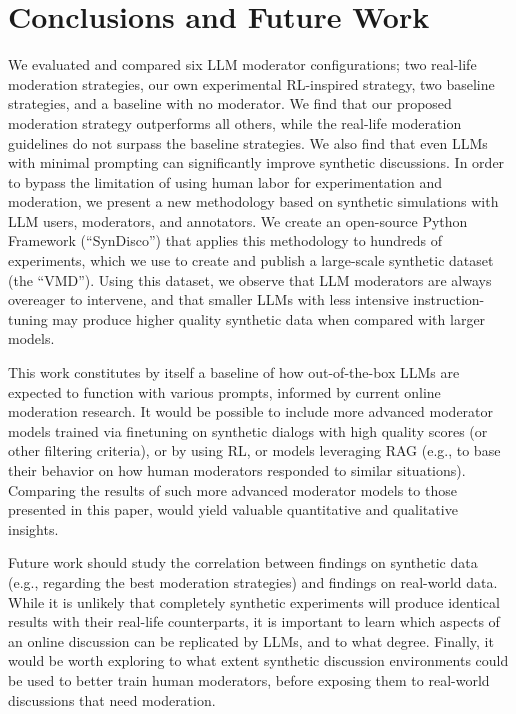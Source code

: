 %

\section{Conclusions and Future Work}

We evaluated and compared six \ac{LLM} moderator configurations; two real-life moderation strategies, our own experimental \ac{RL}-inspired strategy, two baseline strategies, and a baseline with no moderator. We find that our proposed moderation strategy outperforms all others, while the real-life moderation guidelines do not surpass the baseline strategies. We also find that even \acp{LLM} with minimal prompting can significantly improve synthetic discussions. In order to bypass the limitation of using human labor for experimentation and moderation, we present a new methodology based on synthetic simulations with \ac{LLM} users, moderators, and annotators. We create an open-source Python Framework (“SynDisco”) that applies this methodology to hundreds of experiments, which we use to create and publish a large-scale synthetic dataset (the “\acf{VMD}”). Using this dataset, we observe that \ac{LLM} moderators are always overeager to intervene, and that smaller \acp{LLM} with less intensive instruction-tuning may produce higher quality synthetic data when compared with larger models. 

This work constitutes by itself a baseline of how out-of-the-box \acp{LLM} are expected to function with various prompts, informed by current online moderation research. It would be possible to include more advanced  moderator models trained via finetuning on synthetic dialogs with high quality scores (or other filtering criteria), or by using \ac{RL}, or models leveraging \ac{RAG} (e.g., to base their behavior on how human moderators responded to similar situations). Comparing the results of such more advanced moderator models to those presented in this paper, would yield valuable quantitative and qualitative insights.

Future work should study the correlation between findings on synthetic data (e.g., regarding the best moderation strategies) and findings on real-world data. While it is unlikely that completely synthetic experiments will produce identical results with their real-life counterparts, it is important to learn which aspects of an online discussion can be replicated by \acp{LLM}, and to what degree. Finally, it would be worth exploring to what extent synthetic discussion environments could be used to better train human moderators, before exposing them to real-world discussions that need moderation.
